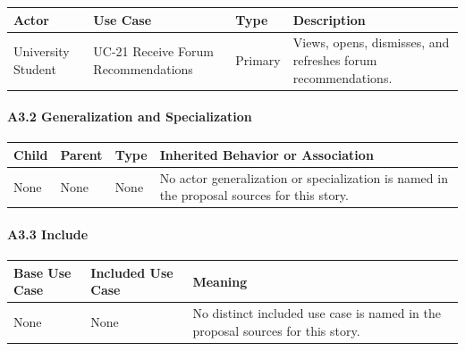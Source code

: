 \documentclass[12pt]{article}
\renewcommand{\baselinestretch}{1.5}
\begin{document}
\begingroup
\small
\renewcommand{\baselinestretch}{1.0}\selectfont
\renewcommand{\arraystretch}{1.15}
\setlength{\tabcolsep}{6pt}
\begin{longtable}{|>{\raggedright\arraybackslash}p{}|>{\raggedright\arraybackslash}p{}|>{\raggedright\arraybackslash}p{}|>{\raggedright\arraybackslash}p{}|}
\hline
\textbf{Actor} & \textbf{Use Case} & \textbf{Type} & \textbf{Description} \\ \hline
\endhead
University Student & UC-21 Receive Forum Recommendations & Primary & Views, opens, dismisses, and refreshes forum recommendations. \\ \hline
\end{longtable}
\endgroup
\par\medskip

\hypertarget{sec:a3-2-generalization-and-specialization}{}
\paragraph*{A3.2 Generalization and Specialization}
\par\medskip

\begingroup
\small
\renewcommand{\baselinestretch}{1.0}\selectfont
\renewcommand{\arraystretch}{1.15}
\setlength{\tabcolsep}{6pt}
\begin{longtable}{|>{\raggedright\arraybackslash}p{}|>{\raggedright\arraybackslash}p{}|>{\raggedright\arraybackslash}p{}|>{\raggedright\arraybackslash}p{}|}
\hline
\textbf{Child} & \textbf{Parent} & \textbf{Type} & \textbf{Inherited Behavior or Association} \\ \hline
\endhead
None & None & None & No actor generalization or specialization is named in the proposal sources for this story. \\ \hline
\end{longtable}
\endgroup
\par\medskip

\hypertarget{sec:a3-3-include}{}
\paragraph*{A3.3 Include}
\par\medskip

\begingroup
\small
\renewcommand{\baselinestretch}{1.0}\selectfont
\renewcommand{\arraystretch}{1.15}
\setlength{\tabcolsep}{6pt}
\begin{longtable}{|>{\raggedright\arraybackslash}p{}|>{\raggedright\arraybackslash}p{}|>{\raggedright\arraybackslash}p{}|}
\hline
\textbf{Base Use Case} & \textbf{Included Use Case} & \textbf{Meaning} \\ \hline
\endhead
None & None & No distinct included use case is named in the proposal sources for this story. \\ \hline
\end{longtable}
\endgroup
\par\medskip
\end{document}

